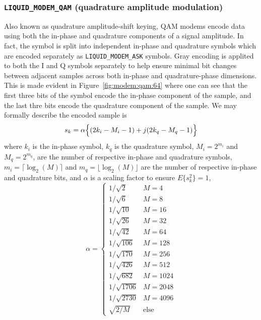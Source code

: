 \subsubsection{{\tt LIQUID\_MODEM\_QAM} (quadrature amplitude modulation)}
\label{module:modem:digital:QAM}
Also known as quadrature amplitude-shift keying, QAM modems encode data using
both the in-phase and quadrature components of a signal amplitude.
In fact, the symbol is split into independent in-phase and quadrature symbols
which are encoded separately as {\tt LIQUID\_MODEM\_ASK} symbols.
Gray encoding is applited to both the I and Q symbols separately to help
ensure minimal bit changes between adjacent samples across both in-phase and
quadrature-phase dimensions.
This is made evident in Figure~\ref{fig:modem:qam:64} where one can see that
the first three bits of the symbol encode the in-phase component of the
sample, and the last thre bits encode the quadrature component of the sample.
%
We may formally describe the encoded sample is
%
\begin{equation}
    s_k = \alpha \Bigl\{ ( 2 k_i - M_i - 1 ) + j(2 k_q - M_q - 1) \Bigr\}
\end{equation}
%
where
$k_i$ is the in-phase symbol,
$k_q$ is the quadrature symbol,
$M_i = 2^{m_i}$ and $M_q = 2^{m_q}$, are the number of respective in-phase and
quadrature symbols,
$m_i=\lceil \log_2(M) \rceil$ and $m_q=\lfloor \log_2(M) \rfloor$ are the
number of respective in-phase and quadrature bits, and
$\alpha$ is a scaling factor to ensure $E\{s_k^2\}=1$,
%
\begin{equation}
    \alpha = 
    \begin{cases}
    1/\sqrt{2}      &   M=4     \\
    1/\sqrt{6}      &   M=8     \\
    1/\sqrt{10}     &   M=16    \\
    1/\sqrt{26}     &   M=32    \\
    1/\sqrt{42}     &   M=64    \\
    1/\sqrt{106}    &   M=128   \\
    1/\sqrt{170}    &   M=256   \\
    1/\sqrt{426}    &   M=512   \\
    1/\sqrt{682}    &   M=1024  \\
    1/\sqrt{1706}   &   M=2048  \\
    1/\sqrt{2730}   &   M=4096  \\
    \sqrt{2/M}      &   \text{else}
    \end{cases}
\end{equation}
